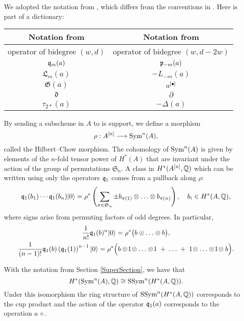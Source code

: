 \begin{remark}
We adopted the notation from \cite{LiQinWang}, which differs from the conventions in \cite{LehnSorger}. Here is part of a dictionary:

\begin{tabular}{c|c} 
Notation from \cite{LiQinWang} & Notation from \cite{LehnSorger} \\\hline
operator of bidegree $(w,d)$ & operator of bidegree $(w,d-2w)$\\
$\mathfrak{q}_m(a) $ & $\mathfrak{p}_{-m}(a)$ \\
$ \mathfrak{L}_m(a) $ & $ - L_{-m}(a)$ \\
$\mathfrak{G}(a)$ & $a^{[\bullet]}$\\
$ \mathfrak{d} $ & $ \partial $ \\
$\tau_{2*}(a)$& $-\Delta(a)$
\end{tabular}
\end{remark}

By sending a subscheme in $A$ to is support, we define a morphism
$$
\rho : A^{[n]} \longrightarrow \operatorname{Sym}^n(A),
$$
called the Hilbert--Chow morphism. The cohomology of $\operatorname{Sym}^n(A)$ is given by elements of the $n$-fold tensor power of $H^*(A)$ that are invariant under the action of the group of permutations $\mathfrak{S}_n$. A class in $H^*(A^{[n]},\mathbb{Q})$ which can be written using only the operators $\mathfrak{q}_1$ comes from a pullback along $\rho$:
\begin{equation}
\label{qSym}
\mathfrak{q}_1(b_1)\cdots \mathfrak{q}_1(b_n)|0\rangle = \rho^*\left( \sum_{\pi\in\mathfrak{S}_n } \pm b_{\pi(1)}\otimes\ldots\otimes b_{\pi(n)} \right), \quad b_i\in H^*(A,\mathbb{Q}),
\end{equation}
where signs arise from permuting factors of odd degrees. In particular,
\begin{gather} \label{q0primitive}
\frac{1}{n!}\mathfrak{q}_1(b)^n |0\rangle = \rho^*\big( b\otimes \ldots \otimes b\big),
\\ \label{q1primitive}
\frac{1}{(n-1)!}\mathfrak{q}_1(b)\left(\mathfrak{q}_1(1)\right)^{n-1}|0\rangle =\rho^*\Big( b\otimes\! 1\!\otimes\ldots\otimes\! 1\; + \;\ldots\; +\; 1\!\otimes\ldots\otimes\! 1\! \otimes b\Big) .
\end{gather}
\begin{remark}
With the notation from Section \ref{SuperSection}, we have that
$$
H^*(\operatorname{Sym}^n(A),\mathbb{Q}) \cong \operatorname{SSym}^n(H^*(A,\mathbb{Q})).
$$
Under this isomorphism the ring structure of $\operatorname{SSym}^n(H^*(A,\mathbb{Q}))$ corresponds to the cup product and the action of the operator $\mathfrak{q}_1(a)$ corresponds to the operation $a\,\diamond$.
\end{remark}

